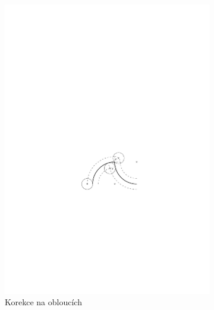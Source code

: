 \begin{figure}[h]
\begin{subfigure}[b]{0.3\textwidth}
						\includegraphics[width=\textwidth]{img/korekce-kruh-dva.pdf}
						\caption{Korekce na obloucích}
					\end{subfigure}
					~
					\begin{subfigure}[b]{0.3\textwidth}
						\centering

\end{subfigure}
\end{figure}
